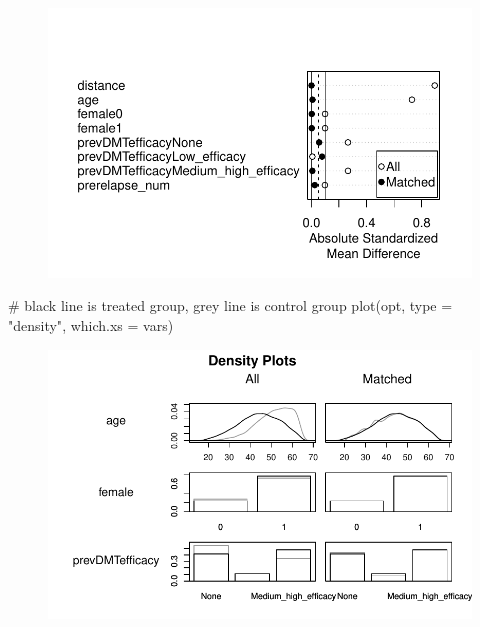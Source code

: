 \documentclass[
  letterpaper,
  DIV=11,
  numbers=noendperiod]{scrreprt}
\newenvironment{Shaded}{\begin{snugshade}}{\end{snugshade}}
\newcommand{\AttributeTok}[1]{\textcolor[rgb]{0.40,0.45,0.13}{#1}}
\newcommand{\CommentTok}[1]{\textcolor[rgb]{0.37,0.37,0.37}{#1}}
\newcommand{\FunctionTok}[1]{\textcolor[rgb]{0.28,0.35,0.67}{#1}}
\newcommand{\NormalTok}[1]{\textcolor[rgb]{0.00,0.23,0.31}{#1}}
\newcommand{\StringTok}[1]{\textcolor[rgb]{0.13,0.47,0.30}{#1}}
\begin{document}
\begin{figure}[H]

{\centering \includegraphics{chapter_06_files/figure-pdf/unnamed-chunk-12-1.pdf}

}

\end{figure}

\begin{Shaded}
\begin{Highlighting}[]
\CommentTok{\# black line is treated group, grey line is control group}
\FunctionTok{plot}\NormalTok{(opt, }\AttributeTok{type =} \StringTok{"density"}\NormalTok{, }\AttributeTok{which.xs =}\NormalTok{ vars) }
\end{Highlighting}
\end{Shaded}

\begin{figure}[H]

{\centering \includegraphics{chapter_06_files/figure-pdf/unnamed-chunk-12-2.pdf}

}

\end{figure}
\end{document}
